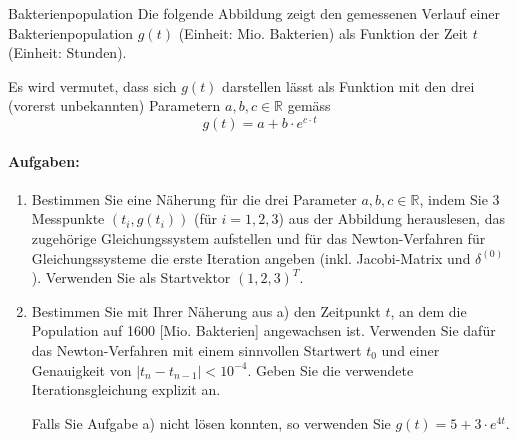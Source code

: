 \begin{example2}{Bakterienpopulation}
Die folgende Abbildung zeigt den gemessenen Verlauf einer Bakterienpopulation $g(t)$ (Einheit: Mio. Bakterien) als Funktion der Zeit $t$ (Einheit: Stunden).

Es wird vermutet, dass sich $g(t)$ darstellen lässt als Funktion mit den drei (vorerst unbekannten) Parametern $a, b, c \in \mathbb{R}$ gemäss
$$g(t) = a + b \cdot e^{c\cdot t}$$

\paragraph{Aufgaben:}
\begin{enumerate}
    \item Bestimmen Sie eine Näherung für die drei Parameter $a, b, c \in \mathbb{R}$, indem Sie 3 Messpunkte $(t_i, g(t_i))$ (für $i = 1, 2, 3$) aus der Abbildung herauslesen, das zugehörige Gleichungssystem aufstellen und für das Newton-Verfahren für Gleichungssysteme die erste Iteration angeben (inkl. Jacobi-Matrix und $\delta^{(0)}$). Verwenden Sie als Startvektor $(1, 2, 3)^T$.

    \item Bestimmen Sie mit Ihrer Näherung aus a) den Zeitpunkt $t$, an dem die Population auf 1600 [Mio. Bakterien] angewachsen ist. Verwenden Sie dafür das Newton-Verfahren mit einem sinnvollen Startwert $t_0$ und einer Genauigkeit von $|t_n - t_{n-1}| < 10^{-4}$. Geben Sie die verwendete Iterationsgleichung explizit an.

    Falls Sie Aufgabe a) nicht lösen konnten, so verwenden Sie $g(t) = 5 + 3 \cdot e^{4t}$.
\end{enumerate}
\end{example2}

